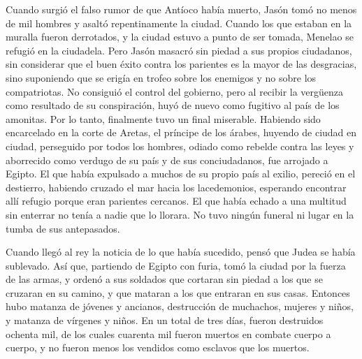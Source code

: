  Cuando surgió el falso rumor de que Antíoco había muerto,
Jasón tomó no menos de mil hombres y asaltó repentinamente la ciudad.
Cuando los que estaban en la muralla fueron derrotados, y la ciudad
estuvo a punto de ser tomada, Menelao se refugió en la ciudadela.
 Pero Jasón masacró sin piedad a sus propios ciudadanos,
sin considerar que el buen éxito contra los parientes es la mayor de las
desgracias, sino suponiendo que se erigía en trofeo sobre los enemigos y
no sobre los compatriotas.  No consiguió el control del
gobierno, pero al recibir la vergüenza como resultado de su
conspiración, huyó de nuevo como fugitivo al país de los amonitas.
 Por lo tanto, finalmente tuvo un final miserable.
Habiendo sido encarcelado en la corte de Aretas, el príncipe de los
árabes, huyendo de ciudad en ciudad, perseguido por todos los hombres,
odiado como rebelde contra las leyes y aborrecido como verdugo de su
país y de sus conciudadanos, fue arrojado a Egipto.  El
que había expulsado a muchos de su propio país al exilio, pereció en el
destierro, habiendo cruzado el mar hacia los lacedemonios, esperando
encontrar allí refugio porque eran parientes cercanos. 
El que había echado a una multitud sin enterrar no tenía a nadie que lo
llorara. No tuvo ningún funeral ni lugar en la tumba de sus antepasados.

 Cuando llegó al rey la noticia de lo que había sucedido,
pensó que Judea se había sublevado. Así que, partiendo de Egipto con
furia, tomó la ciudad por la fuerza de las armas,  y
ordenó a sus soldados que cortaran sin piedad a los que se cruzaran en
su camino, y que mataran a los que entraran en sus casas.
 Entonces hubo matanza de jóvenes y ancianos, destrucción
de muchachos, mujeres y niños, y matanza de vírgenes y niños.
 En un total de tres días, fueron destruidos ochenta mil,
de los cuales cuarenta mil fueron muertos en combate cuerpo a cuerpo, y
no fueron menos los vendidos como esclavos que los muertos.

